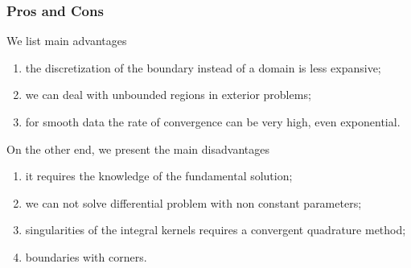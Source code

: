 \documentclass[handout]{beamer}
\begin{document}
\begin{frame}
 \frametitle{Pros and Cons}
 We list main advantages
\begin{exampleblock}{}
\begin{enumerate}[<+->]
 \item the discretization of the boundary instead of a domain is less expansive;
 \item we can deal with unbounded regions in exterior problems;
 \item for smooth data the rate of convergence can be very high, even exponential.
\end{enumerate}
\end{exampleblock}
On the other end, we present the main disadvantages
\begin{alertblock}{}
\begin{enumerate}[<+->]
 \item it requires the knowledge of the fundamental solution; 
 \item we can not solve 
 differential problem with non constant parameters;
 \item singularities of the integral kernels 
  requires a convergent quadrature method;
 \item boundaries with corners.
\end{enumerate}
\end{alertblock}
\end{frame}
\end{document}
